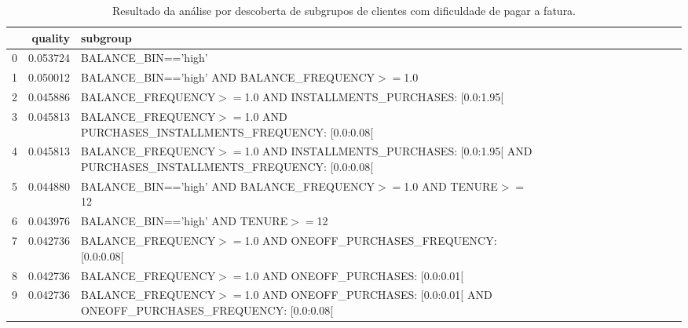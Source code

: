 \documentclass[12pt]{article}
\begin{document}

\begin{table}
\caption{Resultado da análise por descoberta de subgrupos de clientes com dificuldade de pagar a fatura.}
\label{tab:res-analise}
\resizebox{\textwidth}{!}
{
\begin{tabular}{lrlrrrrrrrrrrrrr}
\toprule
 & quality & subgroup \\
\midrule
0 & 0.053724 & BALANCE\_BIN=='high' \\
1 & 0.050012 & BALANCE\_BIN=='high' AND BALANCE\_FREQUENCY$>=$1.0 \\
2 & 0.045886 & BALANCE\_FREQUENCY$>=$1.0 AND INSTALLMENTS\_PURCHASES: [0.0:1.95[ \\
3 & 0.045813 & BALANCE\_FREQUENCY$>=$1.0 AND PURCHASES\_INSTALLMENTS\_FREQUENCY: [0.0:0.08[ \\
4 & 0.045813 & BALANCE\_FREQUENCY$>=$1.0 AND INSTALLMENTS\_PURCHASES: [0.0:1.95[ AND PURCHASES\_INSTALLMENTS\_FREQUENCY: [0.0:0.08[ \\
5 & 0.044880 & BALANCE\_BIN=='high' AND BALANCE\_FREQUENCY$>=$1.0 AND TENURE$>=$12  \\
6 & 0.043976 & BALANCE\_BIN=='high' AND TENURE$>=$12 \\
7 & 0.042736 & BALANCE\_FREQUENCY$>=$1.0 AND ONEOFF\_PURCHASES\_FREQUENCY: [0.0:0.08[ \\
8 & 0.042736 & BALANCE\_FREQUENCY$>=$1.0 AND ONEOFF\_PURCHASES: [0.0:0.01[ \\
9 & 0.042736 & BALANCE\_FREQUENCY$>=$1.0 AND ONEOFF\_PURCHASES: [0.0:0.01[ AND ONEOFF\_PURCHASES\_FREQUENCY: [0.0:0.08[ \\
\bottomrule
\end{tabular}
}
\end{table}
\end{document}
